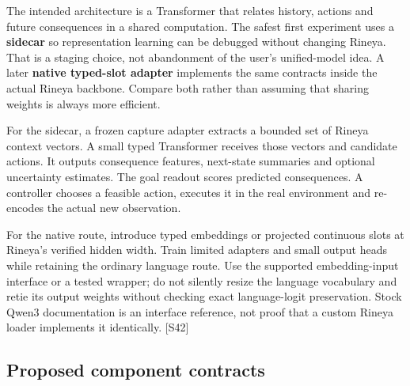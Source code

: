 \documentclass[
  11pt,
  a4paper,
]{article}
\begin{document}
The intended architecture is a Transformer that relates history, actions
and future consequences in a shared computation. The safest first
experiment uses a \textbf{sidecar} so representation learning can be
debugged without changing Rineya. That is a staging choice, not
abandonment of the user's unified-model idea. A later \textbf{native
typed-slot adapter} implements the same contracts inside the actual
Rineya backbone. Compare both rather than assuming that sharing weights
is always more efficient.

For the sidecar, a frozen capture adapter extracts a bounded set of
Rineya context vectors. A small typed Transformer receives those vectors
and candidate actions. It outputs consequence features, next-state
summaries and optional uncertainty estimates. The goal readout scores
predicted consequences. A controller chooses a feasible action, executes
it in the real environment and re-encodes the actual new observation.

For the native route, introduce typed embeddings or projected continuous
slots at Rineya's verified hidden width. Train limited adapters and
small output heads while retaining the ordinary language route. Use the
supported embedding-input interface or a tested wrapper; do not silently
resize the language vocabulary and retie its output weights without
checking exact language-logit preservation. Stock Qwen3 documentation is
an interface reference, not proof that a custom Rineya loader implements
it identically. {[}S42{]}

\subsection{Proposed component
contracts}\label{proposed-component-contracts}
\end{document}
